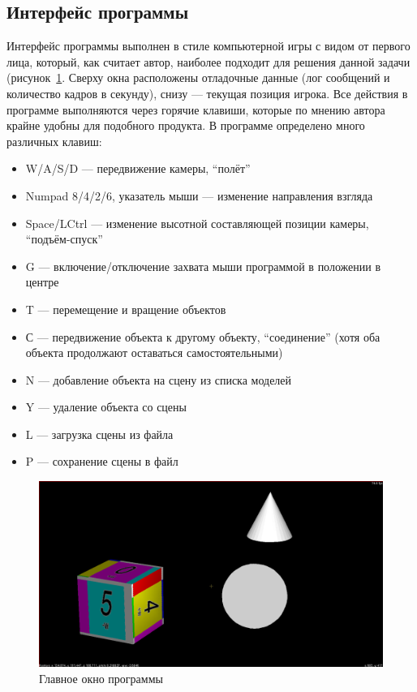 \documentclass[a4paper,12pt]{report}
\numberwithin{equation}{section}
\begin{document}
\subsection{Интерфейс программы}
Интерфейс программы выполнен в стиле компьютерной игры с видом от первого лица, который, как считает автор, наиболее подходит для решения данной задачи (рисунок~\ref{main_screenshot}. Сверху окна расположены отладочные данные (лог сообщений и количество кадров в секунду), снизу --- текущая позиция игрока. Все действия в программе выполняются через горячие клавиши, которые по мнению автора крайне удобны для подобного продукта. В программе определено много различных клавиш:
\begin{itemize}
\item W/A/S/D --- передвижение камеры, ``полёт''
\item Numpad 8/4/2/6, указатель мыши --- изменение направления взгляда
\item Space/LCtrl --- изменение высотной составляющей позиции камеры, ``подъём-спуск''
\item G --- включение/отключение захвата мыши программой в положении в центре
\item T --- перемещение и вращение объектов
\item С --- передвижение объекта к другому объекту, ``соединение'' (хотя оба объекта продолжают оставаться самостоятельными)
\item N --- добавление объекта на сцену из списка моделей
\item Y --- удаление объекта со сцены
\item L --- загрузка сцены из файла
\item P --- сохранение сцены в файл
\end{itemize}

\begin{figure}[!h]
\centering
\includegraphics[width=\textwidth]{window}
\caption{Главное окно программы}
\label{main_screenshot}
\end{figure}
\end{document}
